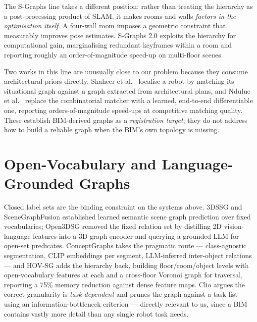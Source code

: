 \documentclass[10pt,twocolumn,letterpaper]{article}
\begin{document}
The S-Graphs line \cite{bavle2022sgraphs,bavle2022sgraphsplus,bavle2025sgraphs2}
takes a different position: rather than treating the hierarchy as a
post-processing product of SLAM, it makes rooms and walls \emph{factors in the
optimisation itself}. A four-wall room imposes a geometric constraint that
measurably improves pose estimates. S-Graphs 2.0 \cite{bavle2025sgraphs2}
exploits the hierarchy for computational gain, marginalising redundant keyframes
within a room and reporting roughly an order-of-magnitude speed-up on
multi-floor scenes.

Two works in this line are unusually close to our problem because they consume
architectural priors directly. Shaheer et al.\
\cite{shaheer2022localization,shaheer2023architectural} localise a robot by
matching its situational graph against a graph extracted from architectural
plans, and Ndulue et al.\ \cite{ndulue2026matching} replace the combinatorial
matcher with a learned, end-to-end differentiable one, reporting
orders-of-magnitude speed-ups at competitive matching quality. These establish
BIM-derived graphs as a \emph{registration target}; they do not address how to
build a reliable graph when the BIM's own topology is missing.

\section{Open-Vocabulary and Language-Grounded Graphs}
\label{sec:openvocab}

Closed label sets are the binding constraint on the systems above. 3DSSG
\cite{wald20203dssg} and SceneGraphFusion \cite{wu2021scenegraphfusion}
established learned semantic scene graph prediction over fixed vocabularies;
Open3DSG \cite{koch2024open3dsg} removed the fixed relation set by distilling
2D vision-language features into a 3D graph encoder and querying a grounded LLM
for open-set predicates. ConceptGraphs \cite{gu2023conceptgraphs} takes the
pragmatic route --- class-agnostic segmentation, CLIP embeddings per segment,
LLM-inferred inter-object relations --- and HOV-SG \cite{werby2024hovsg} adds the
hierarchy back, building floor/room/object levels with open-vocabulary features
at each and a cross-floor Voronoi graph for traversal, reporting a 75\% memory
reduction against dense feature maps. Clio \cite{maggio2024clio} argues the
correct granularity is \emph{task-dependent} and prunes the graph against a
task list using an information-bottleneck criterion --- directly relevant to us,
since a BIM contains vastly more detail than any single robot task needs.
\end{document}
